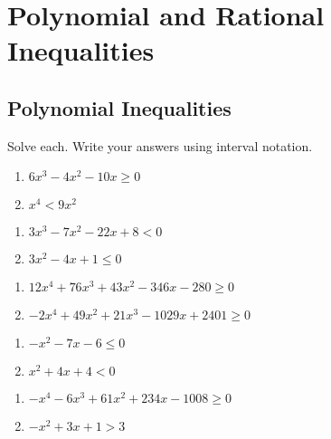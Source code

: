 \chapter{Polynomial and Rational Inequalities}

\section{Polynomial Inequalities}

Solve each. Write your answers using interval notation.
\begin{multicols}{2}
\begin{enumerate}
\item $6x^3-4x^2-10x \geq 0$
\item $x^4 < 9x^2$
\end{enumerate} \setcounter{Review}{\value{enumi}}
\end{multicols}
\begin{multicols}{2}
\begin{enumerate}	\setcounter{enumi}{\value{Review}}
\item $3x^3-7x^2-22x+8 < 0$
\item $3x^2 - 4x + 1 \leq 0$
\end{enumerate} \setcounter{Review}{\value{enumi}}
\end{multicols}
\begin{multicols}{2}
\begin{enumerate}	\setcounter{enumi}{\value{Review}}
\item $12x^4 + 76x^3 + 43x^2 - 346x - 280 \geq 0$
\item $-2x^4 + 49x^2 + 21x^3 - 1029x + 2401 \geq 0$
\end{enumerate} \setcounter{Review}{\value{enumi}}
\end{multicols}
\begin{multicols}{2}
\begin{enumerate}	\setcounter{enumi}{\value{Review}}
\item $-x^2 - 7x - 6 \leq 0$
\item $x^2 + 4x + 4 < 0$
\end{enumerate} \setcounter{Review}{\value{enumi}}
\end{multicols}
\begin{multicols}{2}
\begin{enumerate}	\setcounter{enumi}{\value{Review}}
\item $-x^4 - 6x^3 + 61x^2 + 234x - 1008 \geq 0$
\item $-x^2 + 3x + 1 > 3$
\end{enumerate} \setcounter{Review}{\value{enumi}}
\end{multicols}
